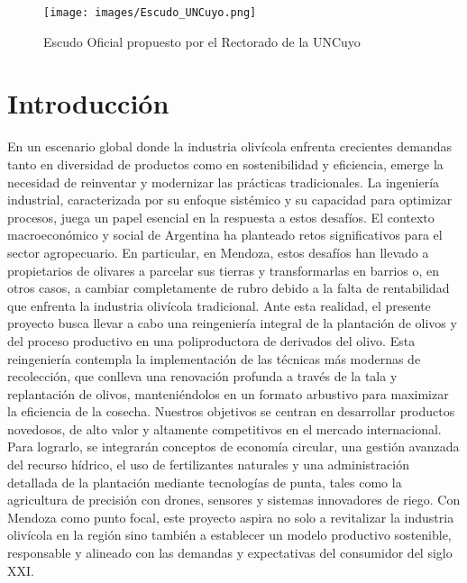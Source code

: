 \documentclass[crop=false]{standalone}
\begin{document}
\begin{figure}
\centering
\texttt{[image: images/Escudo\_UNCuyo.png]}
\label{fig:lionfigure}
\caption{Escudo Oficial propuesto por el Rectorado de la UNCuyo}
\end{figure}



\section{Introducción}
En un escenario global donde la industria olivícola enfrenta crecientes demandas tanto en diversidad de productos como en sostenibilidad y eficiencia, emerge la necesidad de reinventar y modernizar las prácticas tradicionales. La ingeniería industrial, caracterizada por su enfoque sistémico y su capacidad para optimizar procesos, juega un papel esencial en la respuesta a estos desafíos.
El contexto macroeconómico y social de Argentina ha planteado retos significativos para el sector agropecuario. En particular, en Mendoza, estos desafíos han llevado a propietarios de olivares a parcelar sus tierras y transformarlas en barrios o, en otros casos, a cambiar completamente de rubro debido a la falta de rentabilidad que enfrenta la industria olivícola tradicional.
Ante esta realidad, el presente proyecto busca llevar a cabo una reingeniería integral de la plantación de olivos y del proceso productivo en una poliproductora de derivados del olivo. Esta reingeniería contempla la implementación de las técnicas más modernas de recolección, que conlleva una renovación profunda a través de la tala y replantación de olivos, manteniéndolos en un formato arbustivo para maximizar la eficiencia de la cosecha.
Nuestros objetivos se centran en desarrollar productos novedosos, de alto valor y altamente competitivos en el mercado internacional. Para lograrlo, se integrarán conceptos de economía circular, una gestión avanzada del recurso hídrico, el uso de fertilizantes naturales y una administración detallada de la plantación mediante tecnologías de punta, tales como la agricultura de precisión con drones, sensores y sistemas innovadores de riego.
Con Mendoza como punto focal, este proyecto aspira no solo a revitalizar la industria olivícola en la región sino también a establecer un modelo productivo sostenible, responsable y alineado con las demandas y expectativas del consumidor del siglo XXI.
\end{document}
